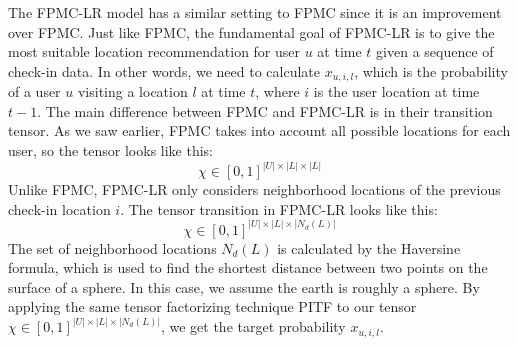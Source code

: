 \documentclass{sig-alternate}
\begin{document}
The FPMC-LR model has a similar setting to FPMC since it is an improvement 
over FPMC. Just like FPMC, the fundamental goal of FPMC-LR is to give the most suitable 
location recommendation for user $u$ at time $t$ given a sequence of check-in data. 
In other words, we need to calculate $x_{u,i,l}$, which is the probability of a user $u$ visiting a location $l$ at time $t$,
where $i$ is the user location at time $t-1$.
The main difference between FPMC and FPMC-LR is in their transition tensor. As we saw earlier, FPMC takes into account 
all possible locations for each user, so the tensor looks like this: 
\begin{equation}
	\chi \in [0, 1]^{|U| \times |L| \times |L|}
\label{eq:summation}
\end{equation}
Unlike FPMC, FPMC-LR only considers neighborhood locations of the previous check-in location $i$. 
The tensor transition in FPMC-LR looks like this:
\begin{equation}
	\chi \in [0, 1]^{|U| \times |L| \times |N_d(L)|}
\label{eq:summation}
\end{equation}
The set of neighborhood locations \begin{math}N_d(L)\end{math} is calculated by the Haversine formula, 
which is used to find the shortest distance between two points on the surface of a sphere. 
In this case, we assume the earth is roughly a sphere. By applying the same tensor factorizing technique PITF to 
our tensor $\chi \in [0, 1]^{|U| \times |L| \times |N_d(L)|}$, we get the target probability $x_{u,i,l}$.
\end{document}
